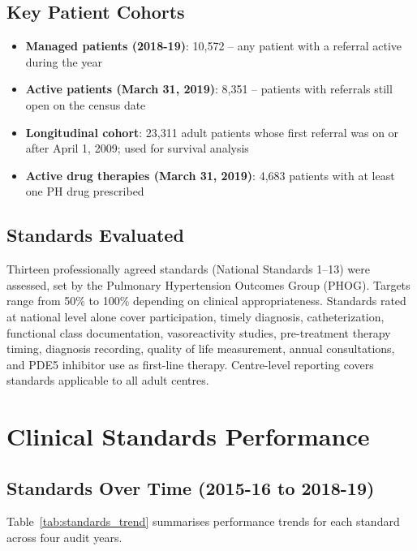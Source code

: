 \documentclass[12pt,a4paper]{article}
\begin{document}
\subsection{Key Patient Cohorts}
\begin{itemize}
    \item \textbf{Managed patients (2018-19)}: 10,572 -- any patient with a referral active during the year
    \item \textbf{Active patients (March 31, 2019)}: 8,351 -- patients with referrals still open on the census date
    \item \textbf{Longitudinal cohort}: 23,311 adult patients whose first referral was on or after April 1, 2009; used for survival analysis
    \item \textbf{Active drug therapies (March 31, 2019)}: 4,683 patients with at least one PH drug prescribed
\end{itemize}

\subsection{Standards Evaluated}
Thirteen professionally agreed standards (National Standards 1--13) were assessed, set by the Pulmonary Hypertension Outcomes Group (PHOG). Targets range from 50\% to 100\% depending on clinical appropriateness. Standards rated at national level alone cover participation, timely diagnosis, catheterization, functional class documentation, vasoreactivity studies, pre-treatment therapy timing, diagnosis recording, quality of life measurement, annual consultations, and PDE5 inhibitor use as first-line therapy. Centre-level reporting covers standards applicable to all adult centres.

\section{Clinical Standards Performance}

\subsection{Standards Over Time (2015-16 to 2018-19)}

Table~\ref{tab:standards_trend} summarises performance trends for each standard across four audit years.
\end{document}
